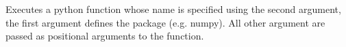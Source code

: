 Executes a python function whose name is specified using the
  second argument, the first argument defines the package (e.g. numpy).
All other argument are passed as positional arguments to the function.
